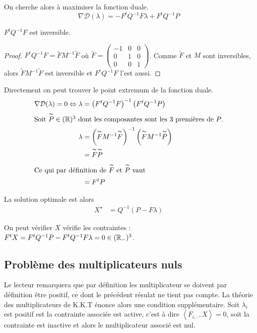 On cherche alors à maximiser la fonction duale.
\begin{equation}
\nabla \mathcal D (\lambda) = -F^tQ^{-1}F\lambda + F^tQ^{-1}P
\end{equation}

\begin{prop}[Inversibilité de $F^tQ^{-1}F$]
  $F^tQ^{-1}F$ est inversible.
\end{prop}
\begin{proof}
$F^tQ^{-1}F = \tilde FM^{-1}\tilde F$ où $\tilde F = \begin{pmatrix}
-1 & 0 & 0 \\
0 & 1 & 0 \\
0 & 0 & 1
\end{pmatrix}$.  Comme $\tilde F$ et $M$ sont inversibles, alors $\tilde FM^{-1}\tilde F$ est inversible et $F^tQ^{-1}F$ l'est aussi.
\end{proof}

Directement on peut trouver le point extremum de la fonction duale.
\begin{align}
\nabla \mathcal D (\lambda) = 0 \Leftrightarrow \lambda &= \left(F^tQ^{-1}F\right)^{-1}\left(F^tQ^{-1}P\right)\\
\intertext{Soit $\overset{\thicksim}{P}\in (\mathbb R)^3$ dont les composantes sont les 3 premières de $P$.}
\lambda &  = \left(\overset{\thicksim}{F}M^{-1}\overset{\thicksim}{F}\right)^{-1}\left(\overset{\thicksim}{F}M^{-1}\overset{\thicksim}{P}\right) \\
& = \overset{\thicksim}{F}\overset{\thicksim}{P}\\
\intertext{Ce qui par définition de $\overset{\thicksim}{F}$ et $\overset{\thicksim}{P}$ vaut}
& = F^tP
\end{align}

La solution optimale est alors
\begin{align}
X^\star &= Q^{-1}\left(P- F\lambda\right)
\end{align}

On peut vérifier $X$ vérifie les contraintes : $ F^t X = F^t Q^{-1} P - F^tQ^{-1}F\lambda = 0 \in (\mathbb R_-)^3$.

\subsection{Problème des multiplicateurs nuls}


Le lecteur remarquera que par définition les multiplicateur se doivent par définition être positif, ce dont le précédent résulat ne tient pas compte. La théorie des multiplicateurs de K.K.T énonce alors une condition supplémentaire. Soit $\lambda_i$ est positif est la contrainte associée est active, c'est à dire $\left<F_{i,:},X\right> = 0$, soit la contrainte est inactive et alors le multiplicateur associé est nul.

